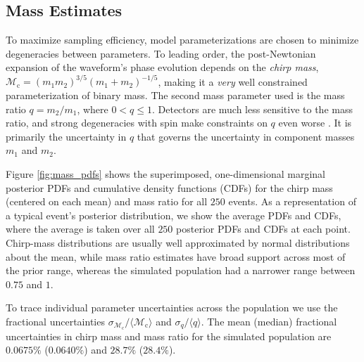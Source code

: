 \subsection{Mass Estimates}\label{sec:mass}
To maximize sampling efficiency, model parameterizations are chosen to minimize degeneracies between parameters.  To leading order, the post-Newtonian expansion of the waveform's phase evolution depends on the \emph{chirp mass}, $\mathcal{M}_\mathrm{c} = (m_1 m_2)^{3/5} (m_1 + m_2)^{-1/5}$, making it a \emph{very} well constrained parameterization of binary mass.  The second mass parameter used is the mass ratio $q = m_2/m_1$, where $0 < q \leq 1$.  Detectors are much less sensitive to the mass ratio, and strong degeneracies with spin make constraints on $q$ even worse \citep{Cutler_1994}.  It is primarily the uncertainty in $q$ that governs the uncertainty in component masses $m_1$ and $m_2$.

Figure \ref{fig:mass_pdfs} shows the superimposed, one-dimensional marginal posterior PDFs and cumulative density functions (CDFs) for the chirp mass (centered on each mean) and mass ratio for all $250$ events.  As a representation of a typical event's posterior distribution, we show the average PDFs and CDFs, where the average is taken over all $250$ posterior PDFs and CDFs at each point. Chirp-mass distributions are usually well approximated by normal distributions about the mean, while mass ratio estimates have broad support across most of the prior range, whereas the simulated population had a narrower range between $0.75$ and $1$.

To trace individual parameter uncertainties across the population we use the fractional uncertainties $\sigma_{\mathcal{M}_\mathrm{c}}/\langle\mathcal{M}_\mathrm{c}\rangle$ and $\sigma_q/\langle q\rangle$. The mean (median) fractional uncertainties in chirp mass and mass ratio for the simulated population are $0.0675\%$ ($0.0640\%$) and $28.7\%$ ($28.4\%$).

